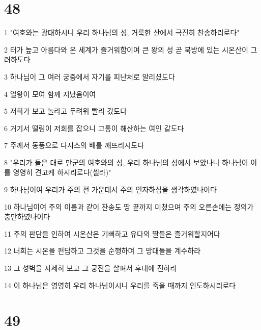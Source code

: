 \chapter{48}

\par 1 "여호와는 광대하시니 우리 하나님의 성, 거룩한 산에서 극진히 찬송하리로다"
\par 2 터가 높고 아름다와 온 세계가 즐거워함이여 큰 왕의 성 곧 북방에 있는 시온산이 그러하도다
\par 3 하나님이 그 여러 궁중에서 자기를 피난처로 알리셨도다
\par 4 열왕이 모여 함께 지났음이여
\par 5 저희가 보고 놀라고 두려워 빨리 갔도다
\par 6 거기서 떨림이 저희를 잡으니 고통이 해산하는 여인 같도다
\par 7 주께서 동풍으로 다시스의 배를 깨뜨리시도다
\par 8 "우리가 들은 대로 만군의 여호와의 성, 우리 하나님의 성에서 보았나니 하나님이 이를 영영히 견고케 하시리로다(셀라)"
\par 9 하나님이여 우리가 주의 전 가운데서 주의 인자하심을 생각하였나이다
\par 10 하나님이여 주의 이름과 같이 찬송도 땅 끝까지 미쳤으며 주의 오른손에는 정의가 충만하였나이다
\par 11 주의 판단을 인하여 시온산은 기뻐하고 유다의 딸들은 즐거워할지어다
\par 12 너희는 시온을 편답하고 그것을 순행하며 그 망대들을 계수하라
\par 13 그 성벽을 자세히 보고 그 궁전을 살펴서 후대에 전하라
\par 14 이 하나님은 영영히 우리 하나님이시니 우리를 죽을 때까지 인도하시리로다

\chapter{49}

